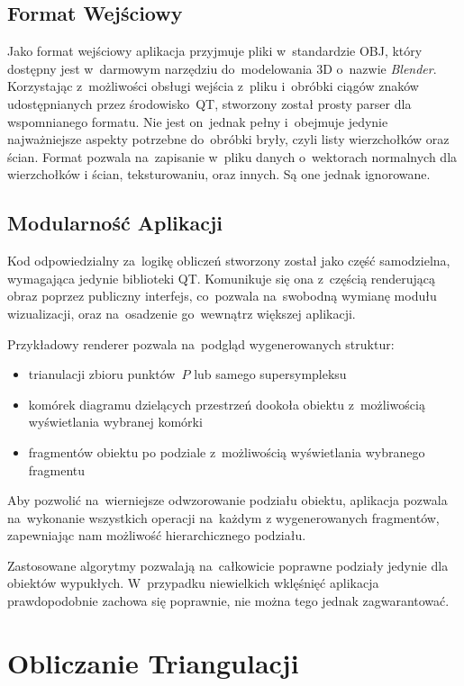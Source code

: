 \documentclass[skorowidz,autorrok,backref,xodstep,oswiadczenie]{wmimgr}
\begin{document}
\subsection{Format Wejściowy}

Jako format wejściowy aplikacja przyjmuje pliki w~standardzie OBJ, który dostępny jest w~darmowym narzędziu do~modelowania 3D o~nazwie \emph{Blender}. Korzystając z~możliwości obsługi wejścia z~pliku i~obróbki ciągów znaków udostępnianych przez środowisko~QT, stworzony został prosty parser dla wspomnianego formatu. Nie jest on~jednak pełny i~obejmuje jedynie najważniejsze aspekty potrzebne do~obróbki bryły, czyli listy wierzchołków oraz ścian. Format pozwala na~zapisanie w~pliku danych o~wektorach normalnych dla wierzchołków i ścian, teksturowaniu, oraz innych. Są one jednak ignorowane.

\subsection{Modularność Aplikacji}

Kod odpowiedzialny za~logikę obliczeń stworzony został jako część samodzielna, wymagająca jedynie biblioteki QT. Komunikuje się ona z~częścią renderującą obraz poprzez publiczny interfejs, co~pozwala na~swobodną wymianę modułu wizualizacji, oraz na~osadzenie go~wewnątrz większej aplikacji.

Przykładowy renderer pozwala na~podgląd wygenerowanych struktur:
\begin{itemize}
\item
trianulacji zbioru punktów~$P$ lub samego supersympleksu
\item
komórek diagramu dzielących przestrzeń dookoła obiektu z~możliwością wyświetlania wybranej komórki
\item
fragmentów obiektu po podziale z~możliwością wyświetlania wybranego fragmentu
\end{itemize}

Aby pozwolić na~wierniejsze odwzorowanie podziału obiektu, aplikacja pozwala na~wykonanie wszystkich operacji na~każdym z wygenerowanych fragmentów, zapewniając nam możliwość hierarchicznego podziału.

Zastosowane algorytmy pozwalają na~całkowicie poprawne podziały jedynie dla obiektów wypukłych. W~przypadku niewielkich wklęśnięć aplikacja prawdopodobnie zachowa się poprawnie, nie można tego jednak zagwarantować.

\section{Obliczanie Triangulacji}
\end{document}
